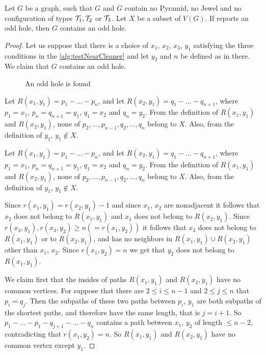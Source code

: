\begin{theorem}
	Let $G$ be a graph, such that $G$ and $\overline{G}$ contain no Pyramid, no Jewel and no configuration of types $\mathcal{T}_1, \mathcal{T}_2$ or $\mathcal{T}_3$. Let $X$ be a subset of $V(G)$. If  reports an odd hole, then $G$ contains an odd hole.
\end{theorem}
\begin{proof}
	Let us suppose that there is a choice of $x_1$, $x_2$, $x_3$, $y_1$ satisfying the three conditions in the \cref{alg:testNearCleaner} and let $y_2$ and $n$ be defined as in there. We claim that $G$ contains an odd hole.
	
	{\makeatletter
	\let\par\@@par
	\par{}
	\everypar{}\begin{wrapfigure}{r}{0.3\textwidth}
		
		\caption{An odd hole is found}%
		\end{wrapfigure}
		Let $R(x_1, y_1) = p_1-\ldots -p_n$, and let $R(x_2, y_1) = q_1-\ldots -q_{n+1}$, where $p_1 = x_1$, $p_n = q_{n+1} = y_1$, $q_1 = x_2$ and $q_n = y_2$. From the definition of $R(x_1, y_1)$ and $R(x_2, y_1)$, none of $p_2, \ldots, p_{n-1}, q_2, \ldots, q_n$ belong to $X$. Also, from the definition of $y_1$, $y_1 \notin X$.

		Let $R(x_1, y_1) = p_1-\ldots -p_n$, and let $R(x_2, y_1) = q_1-\ldots -q_{n+1}$, where $p_1 = x_1$, $p_n = q_{n+1} = y_1$, $q_1 = x_2$ and $q_n = y_2$. From the definition of $R(x_1, y_1)$ and $R(x_2, y_1)$, none of $p_2, \ldots, p_{n-1}, q_2, \ldots, q_n$ belong to $X$. Also, from the definition of $y_1$, $y_1 \notin X$.

		Since $r(x_1, y_1) = r(x_2, y_1) - 1$ and since $x_1$, $x_2$ are nonadjacent it follows that $x_2$ does not belong to $R(x_1, y_1)$ and $x_1$ does not belong to $R(x_2, y_1)$. Since $r(x_3, y_1), r(x_3, y_2) \geq n (= r(x_1, y_2))$ it follows that $x_3$ does not belong to $R(x_1, y_1)$ or to $R(x_2, y_1)$, and has no neighbors in $R(x_1, y_1) \cup R(x_2, y_1)$ other than $x_1$, $x_2$. Since $r(x_1, y_2) = n$ we get that $y_2$ does not belong to $R(x_1, y_1)$.\par}%

	We claim first that the insides of paths $R(x_1, y_1)$ and $R(x_2, y_1)$ have no common vertices. For suppose that there are $2 \leq i \leq n-1$ and $2 \leq j \leq n$ that $p_i = q_j$. Then the subpaths of these two paths between $p_i$, $y_1$ are both subpaths of the shortest paths, and therefore have the same length, that is $j=i+1$. So $p_1-\ldots-p_1-q_{j+1}-\ldots-q_n$ contains a path between $x_1$, $y_2$ of length $\leq n-2$, contradicting that $r(x_1, y_2) = n$. So $R(x_1, y_1)$ and $R(x_2, y_1)$ have no common vertex except $y_1$.


\end{proof}
